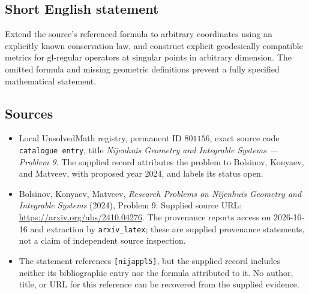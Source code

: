 \documentclass[11pt]{article}
\begin{document}
\subsection{Short English statement}
Extend the source's referenced formula to arbitrary coordinates using an explicitly known conservation law, and construct explicit geodesically compatible metrics for \(\mathrm{gl}\)-regular operators at singular points in arbitrary dimension. The omitted formula and missing geometric definitions prevent a fully specified mathematical statement.
\subsection{Sources}
\begin{itemize}
\item Local UnsolvedMath registry, permanent ID \(801156\), exact source code \texttt{catalogue entry}, title \emph{Nijenhuis Geometry and Integrable Systems --- Problem 9}. The supplied record attributes the problem to Bolsinov, Konyaev, and Matveev, with proposed year 2024, and labels its status open.
\item Bolsinov, Konyaev, Matveev, \emph{Research Problems on Nijenhuis Geometry and Integrable Systems} (2024), Problem 9. Supplied source URL: \url{https://arxiv.org/abs/2410.04276}. The provenance reports access on 2026-10-16 and extraction by \texttt{arxiv\_latex}; these are supplied provenance statements, not a claim of independent source inspection.
\item The statement references \texttt{[nijappl5]}, but the supplied record includes neither its bibliographic entry nor the formula attributed to it. No author, title, or URL for this reference can be recovered from the supplied evidence.
\end{itemize}
\end{document}
